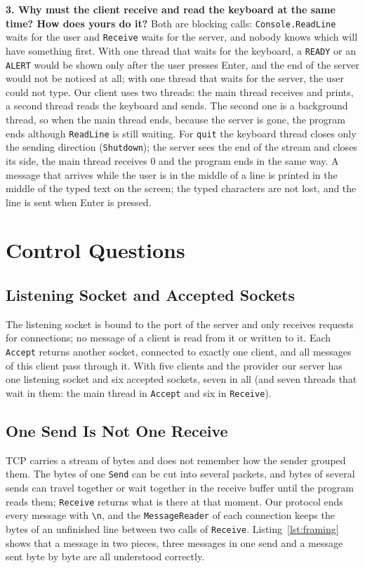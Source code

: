 \documentclass[12pt,a4paper]{article}
\begin{document}
\textbf{3. Why must the client receive and read the keyboard at the same time? How does yours do it?} Both are blocking calls: \texttt{Console.ReadLine} waits for the user and \texttt{Receive} waits for the server, and nobody knows which will have something first. With one thread that waits for the keyboard, a \texttt{READY} or an \texttt{ALERT} would be shown only after the user presses Enter, and the end of the server would not be noticed at all; with one thread that waits for the server, the user could not type. Our client uses two threads: the main thread receives and prints, a second thread reads the keyboard and sends. The second one is a background thread, so when the main thread ends, because the server is gone, the program ends although \texttt{ReadLine} is still waiting. For \texttt{quit} the keyboard thread closes only the sending direction (\texttt{Shutdown}); the server sees the end of the stream and closes its side, the main thread receives 0 and the program ends in the same way. A message that arrives while the user is in the middle of a line is printed in the middle of the typed text on the screen; the typed characters are not lost, and the line is sent when Enter is pressed.

\newpage
\section{Control Questions}
\label{sec:control}

\subsection{Listening Socket and Accepted Sockets}

The listening socket is bound to the port of the server and only receives requests for connections; no message of a client is read from it or written to it. Each \texttt{Accept} returns another socket, connected to exactly one client, and all messages of this client pass through it. With five clients and the provider our server has one listening socket and six accepted sockets, seven in all (and seven threads that wait in them: the main thread in \texttt{Accept} and six in \texttt{Receive}).

\subsection{One Send Is Not One Receive}

TCP carries a stream of bytes and does not remember how the sender grouped them. The bytes of one \texttt{Send} can be cut into several packets, and bytes of several sends can travel together or wait together in the receive buffer until the program reads them; \texttt{Receive} returns what is there at that moment. Our protocol ends every message with \texttt{\textbackslash n}, and the \texttt{MessageReader} of each connection keeps the bytes of an unfinished line between two calls of \texttt{Receive}. Listing~\ref{lst:framing} shows that a message in two pieces, three messages in one send and a message sent byte by byte are all understood correctly.
\end{document}
